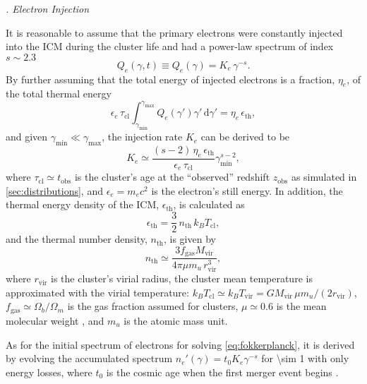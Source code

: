 \documentclass[modern]{aastex62}
\newcommand{\R}[1]{\mathrm{#1}}
\newcommand{\D}[1]{\R{d} #1}
\newcounter{sssseccount}
\newcommand{\sssseclabel}{\alph{sssseccount}}
\newcommand{\ssssec}[1]{%
  \vspace{1ex}%
  \stepcounter{sssseccount}%
  \noindent\emph{\sssseclabel. #1}%
}
\begin{document}
\setcounter{sssseccount}{0}
\ssssec{Electron Injection}

It is reasonable to assume that the primary electrons were constantly
injected into the ICM during the cluster life and had a power-law
spectrum of index $s \sim 2.3$ \citep[e.g.,][]{sarazin1999}
\begin{equation}
  \label{eq:electron-inj}
  Q_e(\gamma, t) \equiv Q_e(\gamma) = K_e \,\gamma^{-s}.
\end{equation}
By further assuming that the total energy of injected electrons is a
fraction, $\eta_e$, of the total thermal energy \citep{cassano2005}
\begin{equation}
  \epsilon_e \,\tau_{\R{cl}} \int_{\gamma_{\R{min}}}^{\gamma_{\R{max}}}
  Q_e(\gamma') \gamma' \,\D{\gamma'}
  = \eta_e \,\epsilon_{\R{th}},
\end{equation}
and given $\gamma_{\R{min}} \ll \gamma_{\R{\max}}$,
the injection rate $K_e$ can be derived to be
\begin{equation}
  \label{eq:injrate}
  K_e \simeq \frac{(s-2)\,\eta_e\,\epsilon_{\R{th}}}{\epsilon_e\,\tau_{\R{cl}}}
    \gamma_{\R{min}}^{s-2},
\end{equation}
where $\tau_{\R{cl}} \simeq t_{\R{obs}}$ is the cluster's age at the
\enquote{observed} redshift $z_{\R{obs}}$ as simulated in \autoref{sec:distributions},
and $\epsilon_e = m_e c^2$ is the electron's still energy.
In addition, the thermal energy density of the ICM, $\epsilon_{\R{th}}$,
is calculated as
\begin{equation}
  \label{eq:energy-density-thermal}
  \epsilon_{\R{th}} = \frac{3}{2} \,n_{\R{th}} \,k_BT_{\R{cl}},
\end{equation}
and the thermal number density, $n_{\R{th}}$, is given by
\begin{equation}
  \label{eq:number-density-thermal}
  n_{\R{th}} \simeq \frac{3 f_{\R{gas}} M_{\R{vir}}}{4\pi \mu m_u \,r^3_{\R{vir}}},
\end{equation}
where
$r_{\R{vir}}$ is the cluster's virial radius,
the cluster mean temperature is approximated with the virial temperature:
$k_BT_{\R{cl}} \simeq k_BT_{\R{vir}} = G M_{\R{vir}} \,\mu m_u / (2 r_{\R{vir}})$,
$f_{\R{gas}} \simeq \Omega_b/\Omega_m$ is the gas fraction assumed
for clusters, $\mu \simeq 0.6$ is the mean molecular weight
\citep[e.g.,][]{ettori2013}, and $m_u$ is the atomic mass unit.

As for the initial spectrum of electrons for solving
\autoref{eq:fokkerplanck}, it is derived by evolving the accumulated spectrum
$n_e'(\gamma) = t_0 K_e \gamma^{-s}$ for \SI{\sim 1}{\Gyr} with only energy
losses, where $t_0$ is the cosmic age when the first merger event begins
\citep[e.g.,][]{brunetti2007}.
\end{document}
